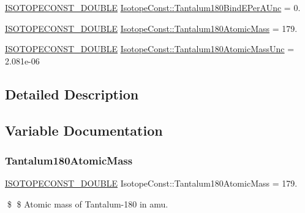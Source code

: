 \begin{DoxyCompactItemize}
\mbox{\hyperlink{group___isotope_const-_macros_ga8f45a7272ce02c0b4c65c44636ed719a}{I\+S\+O\+T\+O\+P\+E\+C\+O\+N\+S\+T\+\_\+\+D\+O\+U\+B\+LE}} \mbox{\hyperlink{group___isotope_const-_tantalum-_ta180_gae4813ecc150c489f7efcc975aac0a84a}{Isotope\+Const\+::\+Tantalum180\+Bind\+E\+Per\+A\+Unc}} = 0.
\item 
\mbox{\hyperlink{group___isotope_const-_macros_ga8f45a7272ce02c0b4c65c44636ed719a}{I\+S\+O\+T\+O\+P\+E\+C\+O\+N\+S\+T\+\_\+\+D\+O\+U\+B\+LE}} \mbox{\hyperlink{group___isotope_const-_tantalum-_ta180_gae360192f0b843a5f7d2ee18e95a51719}{Isotope\+Const\+::\+Tantalum180\+Atomic\+Mass}} = 179.
\item 
\mbox{\hyperlink{group___isotope_const-_macros_ga8f45a7272ce02c0b4c65c44636ed719a}{I\+S\+O\+T\+O\+P\+E\+C\+O\+N\+S\+T\+\_\+\+D\+O\+U\+B\+LE}} \mbox{\hyperlink{group___isotope_const-_tantalum-_ta180_gae891f4d12a5788c9793a3ce603c2321c}{Isotope\+Const\+::\+Tantalum180\+Atomic\+Mass\+Unc}} = 2.\+081e-\/06
\end{DoxyCompactItemize}


\subsection{Detailed Description}


\subsection{Variable Documentation}
\mbox{\label{group___isotope_const-_tantalum-_ta180_gae360192f0b843a5f7d2ee18e95a51719}} 
\subsubsection{\texorpdfstring{Tantalum180\+Atomic\+Mass}{Tantalum180AtomicMass}}
{\footnotesize\ttfamily \mbox{\hyperlink{group___isotope_const-_macros_ga8f45a7272ce02c0b4c65c44636ed719a}{I\+S\+O\+T\+O\+P\+E\+C\+O\+N\+S\+T\+\_\+\+D\+O\+U\+B\+LE}} Isotope\+Const\+::\+Tantalum180\+Atomic\+Mass = 179.}

\$ \$ Atomic mass of Tantalum-\/180 in amu. \mbox{\label{group___isotope_const-_tantalum-_ta180_gae891f4d12a5788c9793a3ce603c2321c}} 
